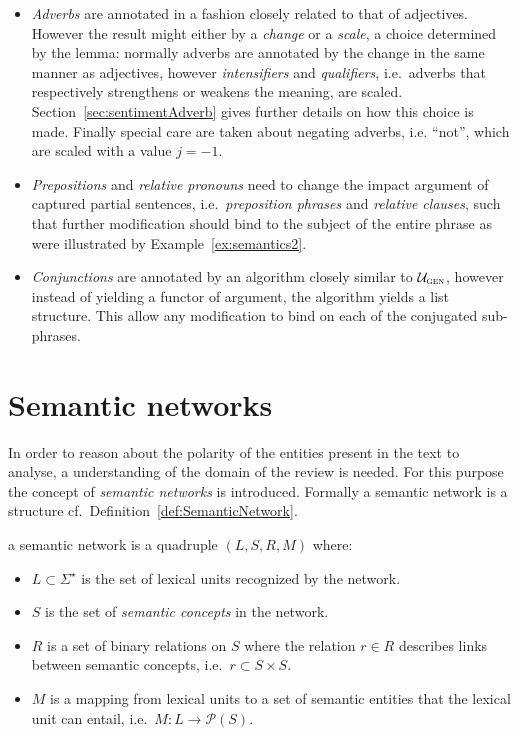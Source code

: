 \begin{itemize}
	\item \emph{Adverbs} are annotated in a fashion closely related to that of adjectives. However the result might either by a \emph{change} or a \emph{scale}, a choice determined by the lemma: normally adverbs are annotated by the change in the same manner as adjectives, however \emph{intensifiers} and \emph{qualifiers}, i.e.\ adverbs that respectively strengthens or weakens the meaning, are scaled. Section~\ref{sec:sentimentAdverb} gives further details on how this choice is made. Finally special care are taken about negating adverbs, i.e. ``not'', which are scaled with a value $j = -1$.

	\item \emph{Prepositions} and \emph{relative pronouns} need to change the impact argument of captured partial sentences, i.e.\ \emph{preposition phrases} and \emph{relative clauses}, such that further modification should bind to the subject of the entire phrase as were illustrated by Example~\ref{ex:semantics2}.

	\item \emph{Conjunctions} are annotated by an algorithm closely similar to $\mathcal{U}_\textsc{gen}$, however instead of yielding a functor of argument, the algorithm yields a list structure. This allow any modification to bind on each of the conjugated sub-phrases.
	
\end{itemize}


\section{Semantic networks}
\label{sec:sentimentValue}

In order to reason about the polarity of the entities present in the text to analyse, a understanding of the domain of the review is needed.  For this purpose the concept of \emph{semantic networks} is introduced. Formally a semantic network is a structure cf.\ Definition~\ref{def:SemanticNetwork}.
\begin{definition}
a semantic network is a quadruple $(L,S,R,M)$ where:\\[-2em]
  \begin{itemize} %
    \item $L \subset \Sigma^\star$ is the set of lexical units recognized by the network.
    \item $S$ is the set of \emph{semantic concepts} in the network.
    \item $R$ is a set of binary relations on $S$ where the relation $r \in R$ describes links\\ between semantic concepts, i.e.\ $r \subset S \times S$. 
    \item $M$ is a mapping from lexical units to a set of semantic entities that the lexical\\ unit can entail, i.e.\ $M: L \to \mathcal{P}(S)$.
  \end{itemize}
  \label{def:SemanticNetwork}
  \vspace{-1em}
  \done
\end{definition}
\vspace{-2em}


